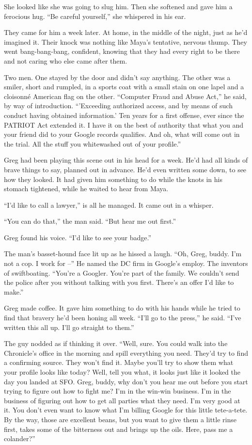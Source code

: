She looked like she was going to slug him. Then she softened and gave 
him a ferocious hug. “Be careful yourself,” she whispered in his 
ear.

\tb

They came for him a week later. At home, in the middle of the night, 
just as he'd imagined it. Their knock was nothing like Maya's 
tentative, nervous thump. They went bang-bang-bang, confident, knowing 
that they had every right to be there and not caring who else came 
after them.

Two men. One stayed by the door and didn't say anything. The other was 
a smiler, short and rumpled, in a sports coat with a small stain on one 
lapel and a cloisonné American flag on the other. “Computer Fraud 
and Abuse Act,” he said, by way of introduction. “'Exceeding 
authorized access, and by means of such conduct having obtained 
information.' Ten years for a first offense, ever since the PATRIOT Act 
extended it. I have it on the best of authority that what you and your 
friend did to your Google records qualifies. And oh, what will come out 
in the trial. All the stuff you whitewashed out of your profile.”

Greg had been playing this scene out in his head for a week. He'd had 
all kinds of brave things to say, planned out in advance. He'd even 
written some down, to see how they looked. It had given him something 
to do while the knots in his stomach tightened, while he waited to hear 
from Maya.

“I'd like to call a lawyer,” is all he managed. It came out in a 
whisper.

“You can do that,” the man said. “But hear me out first.”

Greg found his voice. “I'd like to see your badge.”

The man's basset-hound face lit up as he hissed a laugh. “Oh, Greg, 
buddy. I'm not a cop. I work for --” He named the DC firm in Google's 
employ. The inventors of swiftboating. “You're a Googler. You're part 
of the family. We couldn't send the police after you without talking 
with you first. There's an offer I'd like to make.”

Greg made coffee. It gave him something to do with his hands while he 
tried to find that bravery he'd been honing all week. “I'll go to the 
press,” he said. “I've written this all up. I'll go straight to 
them.”

The guy nodded as if thinking it over. “Well, sure. You could walk 
into the Chronicle's office in the morning and spill everything you 
need. They'd try to find a confirming source. They won't find it. Maybe 
you'll try to show them what your profile looks like today? Well, tell 
you what, it looks just like it looked the day you landed at SFO. Greg, 
buddy, why don't you hear me out before you start trying to figure out 
how to fight me? I'm in the win-win business. I'm in the business of 
figuring out how to get all parties what they need. I'm very good at 
it. You don't even want to know what I'm billing Google for this little 
tete-a-tete. By the way, those are excellent beans, but you want to 
give them a little rinse first, takes some of the bitterness out and 
brings up the oils. Here, pass me a colander?”

